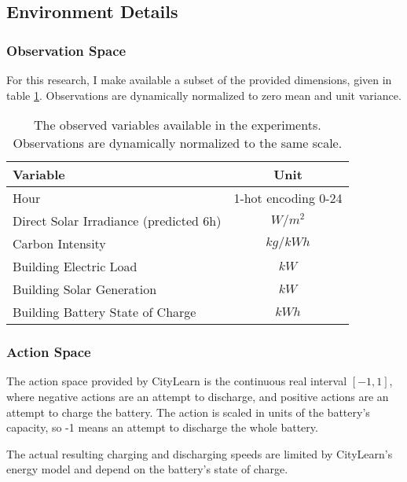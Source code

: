 \subsection{Environment Details}
\subsubsection{Observation Space}
For this research, I make available a subset of the provided dimensions, given in table \ref{tab:observations}. Observations are dynamically normalized to zero mean and unit variance.

\begin{table}[h]
    \caption{The observed variables available in the experiments. Observations are dynamically normalized to the same scale.} \label{tab:observations}
    \centering
    \begin{tabular}{l|c}
        Variable & Unit \\ \hline
        Hour & 1-hot encoding 0-24 \\
        Direct Solar Irradiance (predicted 6h) & $W/m^2$ \\
        Carbon Intensity & $kg/kWh$ \\
        Building Electric Load & $kW$\\
        Building Solar Generation & $kW$\\
        Building Battery State of Charge & $kWh$\\
    \end{tabular}
\end{table}

\subsubsection{Action Space}
The action space provided by CityLearn is the continuous real interval $[-1,1]$, where negative actions are an attempt to discharge, and positive actions are an attempt to charge the battery.
The action is scaled in units of the battery's capacity, so -1 means an attempt to discharge the whole battery.

The actual resulting charging and discharging speeds are limited by CityLearn's energy model and depend on the battery's state of charge.

